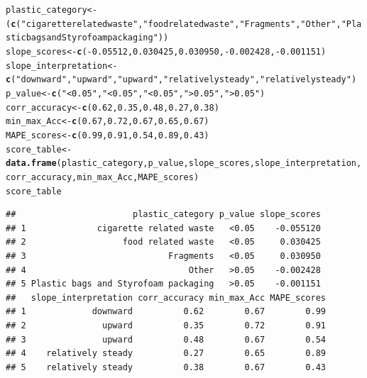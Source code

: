 \documentclass[10pt]{article}\usepackage[]{graphicx}\usepackage[]{color}
\makeatletter
\newcommand{\hlnum}[1]{\textcolor[rgb]{0.686,0.059,0.569}{#1}}%
\newcommand{\hlstr}[1]{\textcolor[rgb]{0.192,0.494,0.8}{#1}}%
\newcommand{\hlopt}[1]{\textcolor[rgb]{0,0,0}{#1}}%
\newcommand{\hlstd}[1]{\textcolor[rgb]{0.345,0.345,0.345}{#1}}%
\newcommand{\hlkwb}[1]{\textcolor[rgb]{0.69,0.353,0.396}{#1}}%
\newcommand{\hlkwd}[1]{\textcolor[rgb]{0.737,0.353,0.396}{\textbf{#1}}}%
\newenvironment{kframe}{%
 \def\at@end@of@kframe{}%
 \ifinner\ifhmode%
  \def\at@end@of@kframe{\end{minipage}}%
  \begin{minipage}{\columnwidth}%
 \fi\fi%
 \def\FrameCommand##1{\hskip\@totalleftmargin \hskip-\fboxsep
 \colorbox{shadecolor}{##1}\hskip-\fboxsep
     \hskip-\linewidth \hskip-\@totalleftmargin \hskip\columnwidth}%
 \MakeFramed {\advance\hsize-\width
   \@totalleftmargin\z@ \linewidth\hsize
   \@setminipage}}%
 {\par\unskip\endMakeFramed%
 \at@end@of@kframe}
\newenvironment{knitrout}{}{} %
\makeatother
\begin{document}
\begin{knitrout}\small
{}\color{fgcolor}\begin{kframe}
\begin{alltt}
\hlstd{plastic_category} \hlkwb{<-}\hlstd{(}\hlkwd{c}\hlstd{(}\hlstr{"cigarette related waste"}\hlstd{,} \hlstr{"food related waste"}\hlstd{,}\hlstr{"Fragments"}\hlstd{,} \hlstr{"Other"}\hlstd{,}\hlstr{"Plastic bags and Styrofoam packaging"} \hlstd{))}
\hlstd{slope_scores} \hlkwb{<-} \hlkwd{c}\hlstd{(}\hlopt{-}\hlnum{0.05512}\hlstd{,}\hlnum{0.030425}\hlstd{,} \hlnum{0.030950}\hlstd{,}\hlopt{-}\hlnum{0.002428}\hlstd{,}\hlopt{-}\hlnum{0.001151}\hlstd{)}
\hlstd{slope_interpretation} \hlkwb{<-}\hlkwd{c}\hlstd{(}\hlstr{"downward"}\hlstd{,} \hlstr{"upward"}\hlstd{,} \hlstr{"upward"}\hlstd{,} \hlstr{"relatively steady"}\hlstd{,} \hlstr{"relatively steady"}\hlstd{)}
\hlstd{p_value}\hlkwb{<-}\hlkwd{c}\hlstd{(}\hlstr{"<0.05"}\hlstd{,}\hlstr{"<0.05"}\hlstd{,}\hlstr{"<0.05"}\hlstd{,} \hlstr{">0.05"}\hlstd{,}\hlstr{">0.05"}\hlstd{)}
\hlstd{corr_accuracy}\hlkwb{<-}\hlkwd{c}\hlstd{(}\hlnum{0.62}\hlstd{,} \hlnum{0.35}\hlstd{,}\hlnum{0.48}\hlstd{,} \hlnum{0.27}\hlstd{,}\hlnum{0.38}\hlstd{)}
\hlstd{min_max_Acc}\hlkwb{<-}\hlkwd{c}\hlstd{(}\hlnum{0.67}\hlstd{,}\hlnum{0.72}\hlstd{,}\hlnum{0.67}\hlstd{,} \hlnum{0.65} \hlstd{,}\hlnum{0.67}\hlstd{)}
\hlstd{MAPE_scores}\hlkwb{<-}\hlkwd{c}\hlstd{(}\hlnum{0.99}\hlstd{,}\hlnum{0.91}\hlstd{,}\hlnum{0.54}\hlstd{,} \hlnum{0.89}\hlstd{,} \hlnum{0.43}\hlstd{)}
\hlstd{score_table} \hlkwb{<-} \hlkwd{data.frame}\hlstd{(plastic_category, p_value,slope_scores, slope_interpretation, corr_accuracy,min_max_Acc, MAPE_scores)}
\hlstd{score_table}
\end{alltt}
\begin{verbatim}
##                       plastic_category p_value slope_scores
## 1              cigarette related waste   <0.05    -0.055120
## 2                   food related waste   <0.05     0.030425
## 3                            Fragments   <0.05     0.030950
## 4                                Other   >0.05    -0.002428
## 5 Plastic bags and Styrofoam packaging   >0.05    -0.001151
##   slope_interpretation corr_accuracy min_max_Acc MAPE_scores
## 1             downward          0.62        0.67        0.99
## 2               upward          0.35        0.72        0.91
## 3               upward          0.48        0.67        0.54
## 4    relatively steady          0.27        0.65        0.89
## 5    relatively steady          0.38        0.67        0.43
\end{verbatim}
\end{kframe}
\end{knitrout}
\end{document}
